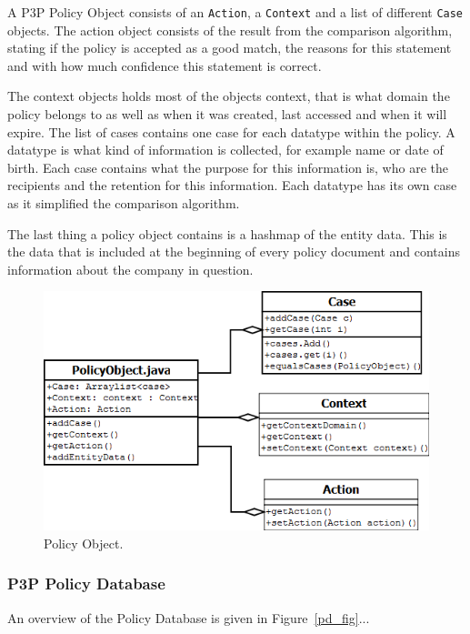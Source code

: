A P3P Policy Object consists of an \texttt{Action}, a \texttt{Context} and a list of different \texttt{Case} objects. The action object consists of the result from the comparison algorithm, stating if the policy is accepted as a good match, the reasons for this statement and with how much confidence this statement is correct.

The context objects holds most of the objects context, that is what domain the policy belongs to as well as when it was created, last accessed and when it will expire. The list of cases contains one case for each datatype within the policy. A datatype is what kind of information is collected, for example name or date of birth. Each case contains what the purpose for this information is, who are the recipients and the retention for this information. Each datatype has its own case as it simplified the comparison algorithm.

The last thing a policy object contains is a hashmap of the entity data. This is the data that is included at the beginning of every policy document and contains information about the company in question.

\begin{figure}[htbp]
\begin{center}
\includegraphics[width = \textwidth]{DesignReport/uml/po.png}
\caption{Policy Object.}
\label{po_fig}
\end{center}
\end{figure}

\subsubsection{P3P Policy Database}

An overview of the Policy Database is given in Figure~\ref{pd_fig}...

